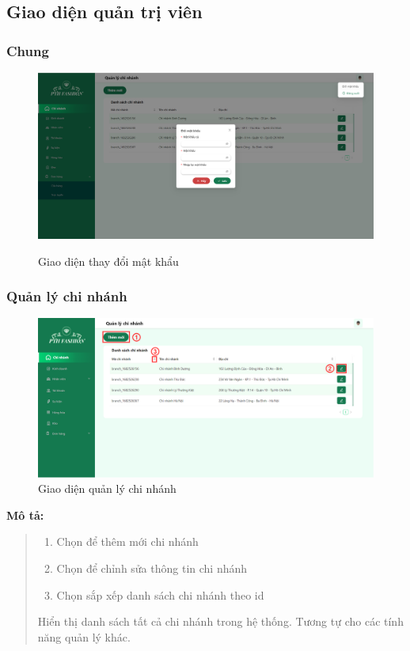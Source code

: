 \newpage
\subsection{Giao diện quản trị viên}
\subsubsection{Chung}
\begin{figure}[!htp]
    \centering
    \includegraphics[width=12cm]{img/UI/admin_implement/changePassword.png}
    \label{20}
    \newline
    \caption{Giao diện thay đổi mật khẩu}
\end{figure}


\subsubsection{Quản lý chi nhánh}
\begin{figure}[!htp]
    \centering
    \includegraphics[width=12cm]{img/UI/admin_implement/branch.png}
    \newline
    \caption{Giao diện quản lý chi nhánh}
\end{figure}

\textbf{Mô tả:}
\begin{quote}
    \begin{enumerate}
        \item Chọn để thêm mới chi nhánh
        \item Chọn để chỉnh sửa thông tin chi nhánh
        \item Chọn sắp xếp danh sách chi nhánh theo id
    \end{enumerate}
    Hiển thị danh sách tất cả chi nhánh trong hệ thống. Tương tự cho các tính năng quản lý khác.
\end{quote}

